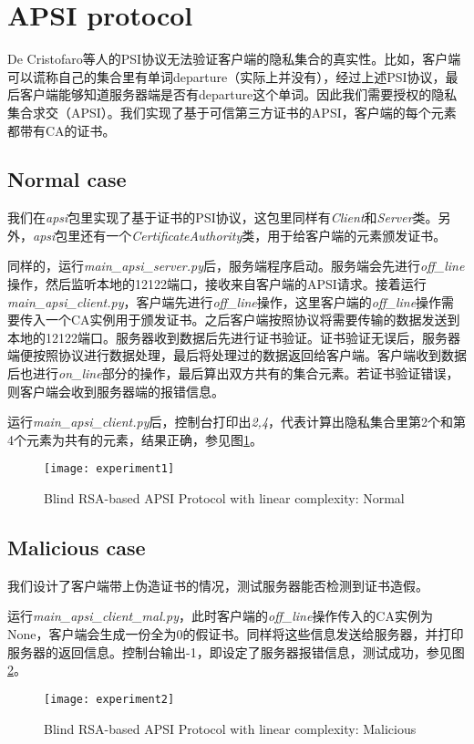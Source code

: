 \section{APSI protocol}
De Cristofaro等人的PSI协议无法验证客户端的隐私集合的真实性。比如，客户端可以谎称自己的集合里有单词departure（实际上并没有），经过上述PSI协议，最后客户端能够知道服务器端是否有departure这个单词。因此我们需要授权的隐私集合求交（APSI）。我们实现了基于可信第三方证书的APSI，客户端的每个元素都带有CA的证书。

\subsection{Normal case}
我们在\textit{apsi}包里实现了基于证书的PSI协议，这包里同样有\textit{Client}和\textit{Server}类。另外，\textit{apsi}包里还有一个\textit{CertificateAuthority}类，用于给客户端的元素颁发证书。

同样的，运行\textit{main\_apsi\_server.py}后，服务端程序启动。服务端会先进行\textit{off\_line}操作，然后监听本地的12122端口，接收来自客户端的APSI请求。接着运行\textit{main\_apsi\_client.py}，客户端先进行\textit{off\_line}操作，这里客户端的\textit{off\_line}操作需要传入一个CA实例用于颁发证书。之后客户端按照协议将需要传输的数据发送到本地的12122端口。服务器收到数据后先进行证书验证。证书验证无误后，服务器端便按照协议进行数据处理，最后将处理过的数据返回给客户端。客户端收到数据后也进行\textit{on\_line}部分的操作，最后算出双方共有的集合元素。若证书验证错误，则客户端会收到服务器端的报错信息。

运行\textit{main\_apsi\_client.py}后，控制台打印出\textit{2,4}，代表计算出隐私集合里第2个和第4个元素为共有的元素，结果正确，参见图\ref{fig:experiment1}。
\begin{figure}[h]
    \centering
    \texttt{[image: experiment1]}
    \caption{Blind RSA-based APSI Protocol with linear complexity: Normal}
    \label{fig:experiment1}
\end{figure}


\subsection{Malicious case}
我们设计了客户端带上伪造证书的情况，测试服务器能否检测到证书造假。

运行\textit{main\_apsi\_client\_mal.py}，此时客户端的\textit{off\_line}操作传入的CA实例为None，客户端会生成一份全为0的假证书。同样将这些信息发送给服务器，并打印服务器的返回信息。控制台输出-1，即设定了服务器报错信息，测试成功，参见图\ref{fig:experiment2}。
\begin{figure}[h]
    \centering
    \texttt{[image: experiment2]}
    \caption{Blind RSA-based APSI Protocol with linear complexity: Malicious}
    \label{fig:experiment2}
\end{figure}